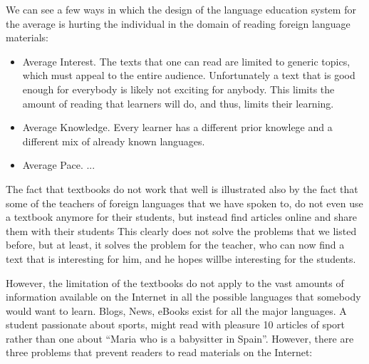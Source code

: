 We can see a few ways in which the design of the language education system for the average is hurting the individual in the domain of reading foreign language materials: 

\begin{itemize}
	\item Average Interest. The texts that one can read are limited to generic topics, which must appeal to the entire audience. Unfortunately a text that is good enough for everybody is likely not exciting for anybody. This limits the amount of reading that learners will do, and thus, limits their learning.
	\item Average Knowledge.  Every learner has a different prior knowlege and a different mix of already known languages. 
	\item Average Pace. ... 
\end{itemize}


The fact that textbooks do not work that well is illustrated also by the fact that some of the teachers of foreign languages that we have spoken to, do not even use a textbook anymore for their students, but instead find articles online and share them with their students  This clearly does not solve the problems that we listed before, but at least, it solves the problem for the teacher, who can now find a text that is interesting for him, and he hopes willbe interesting for the students.

However, the limitation of the textbooks do not apply to the vast amounts of information available on the Internet in all the possible languages that somebody would want to learn. Blogs, News, eBooks exist for all the major languages. A student passionate about sports, might read with pleasure 10 articles of sport rather than one about ``Maria who is a babysitter in Spain''. However, there are three problems that prevent readers to read materials on the Internet:

